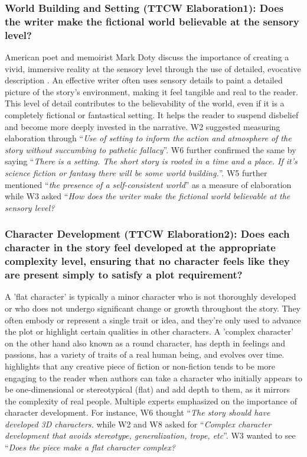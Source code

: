 \subsubsection{\textbf{{\color{blue} World Building and Setting (TTCW Elaboration1)}: Does the writer make the fictional world believable at the sensory level?}} American poet and memoirist Mark Doty discuss the importance of creating a vivid, immersive reality at the sensory level through the use of detailed, evocative description \cite{doty2014art}. An effective writer often uses sensory details to paint a detailed picture of the story's environment, making it feel tangible and real to the reader. This level of detail contributes to the believability of the world, even if it is a completely fictional or fantastical setting. It helps the reader to suspend disbelief and become more deeply invested in the narrative. W2 suggested measuring elaboration through ``\textit{Use of setting to inform the action and atmosphere of the story without succumbing to pathetic fallacy}''. W6 further confirmed the same by saying ``\textit{There is a setting. The short story is rooted in a time and a place. If it's science fiction or fantasy there will be some world building.}''. W5 further mentioned ``\textit{the presence of a self-consistent world}'' as a measure of elaboration while W3 asked ``\textit{How does the writer make the fictional world believable at the sensory level?}
\subsubsection{\textbf{{\color{blue}Character Development (TTCW Elaboration2)}: Does each character in the story feel developed at the appropriate complexity level, ensuring that no character feels like they are present simply to satisfy a plot requirement?}} A 'flat character' is typically a minor character who is not thoroughly developed or who does not undergo significant change or growth throughout the story. They often embody or represent a single trait or idea, and they're only used to advance the plot or highlight certain qualities in other characters. A 'complex character' on the other hand also known as a round character, has depth in feelings and passions, has a variety of traits of a real human being, and evolves over time. \citet{forster1927aspects,fishelov1990types,currie1990nature} highlights that any creative piece of fiction or non-fiction tends to be more engaging to the reader when authors can take a character who initially appears to be one-dimensional or stereotypical (flat) and add depth to them, as it mirrors the complexity of real people. Multiple experts emphasized on the importance of character development. For instance, W6 thought ``\textit{The story should have developed 3D characters.} while W2 and W8 asked for ``\textit{Complex character development that avoids stereotype, generalization, trope, etc}''. W3 wanted to see ``\textit{Does the piece make a flat character complex?}
